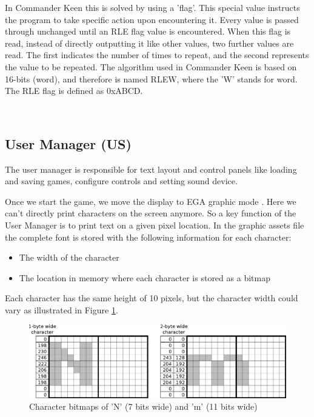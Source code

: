 \documentclass[book.tex]{subfiles}
\begin{document}
\par
In Commander Keen this is solved by using a 'flag'. This special value instructs the program to take specific action upon encountering it. Every value is passed through unchanged until an RLE flag value is encountered. When this flag is read, instead of directly outputting it like other values, two further values are read. The first indicates the number of times to repeat, and the second represents the value to be repeated. The algorithm used in Commander Keen is based on 16-bits (word), and therefore is named RLEW, where the 'W' stands for word. The RLE flag is defined as 0xABCD.\\


\par
\begin{minipage}{\textwidth}
 \par
 \end{minipage}\\

\par

 
\subsection{User Manager (US)} 
\label{section:bitshifting}
The user manager is responsible for text layout and control panels like loading and saving games, configure controls and setting sound device.\\
\par

Once we start the game, we move the display to EGA graphic mode . Here we can't directly print characters on the screen anymore. So a key function of the User Manager is to print text on a given pixel location. In the graphic assets file the complete font is stored with the following information for each character:
\begin{itemize}
  \item The width of the character
  \item The location in memory where each character is stored as a bitmap
\end{itemize}
Each character has the same height of 10 pixels, but the character width could vary as illustrated in Figure \ref{fig:text_bitmap}. 
\begin{figure}[H]
\centering
 \includegraphics[width=\textwidth]{imgs/drawings/text_bitmap.eps}
 \caption{Character bitmaps of 'N' (7 bits wide) and 'm' (11 bits wide)}
 \label{fig:text_bitmap}
 \end{figure}
 \par
 
\end{document}
